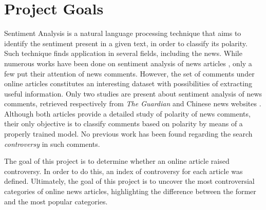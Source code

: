 \section{Project Goals}
Sentiment Analysis is a natural language processing technique that aims to identify the sentiment present in a given text, in order to classify its polarity. Such technique finds application in several fields, including the news. While numerous works have been done on sentiment analysis of news articles \cite{News_1, News_2}, only a few put their attention of news comments. However, the set of comments under online articles constitutes an interesting dataset with possibilities of extracting useful information.
Only two studies are present about sentiment analysis of news comments, retrieved respectively from \textit{The Guardian} \cite{Guardian} and Chinese news websites \cite{Chinese}. Although both articles provide a detailed study of polarity of news comments, their only objective is to classify comments based on polarity by means of a properly trained model. No previous work has been found regarding the search \textit{controversy} in such comments. 

\noindent The goal of this project is to determine whether an online article raised controversy. In order to do this, an index of controversy for each article was defined. Ultimately, the goal of this project is to uncover the most controversial categories of online news articles, highlighting the difference between the former and the most popular categories.